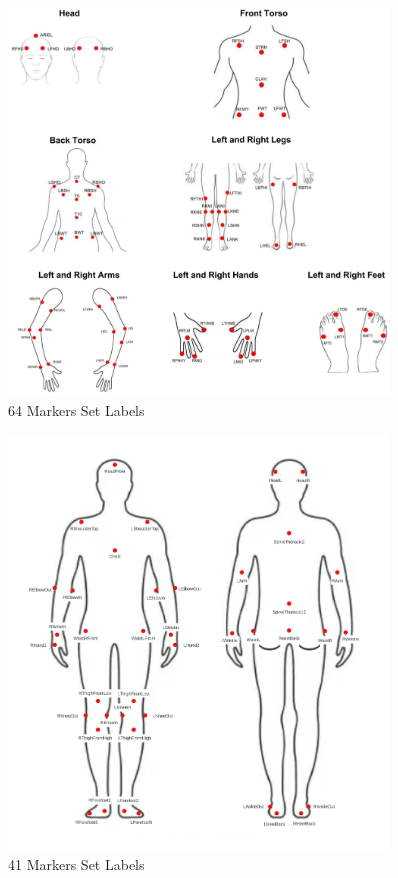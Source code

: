 \begin{figure}[H]
    \centering
    \includegraphics[width=0.9\textwidth]{graphics/full_marker_set.png}
    \caption{64 Markers Set Labels}
    \label{fig:64markers}
\end{figure}

\begin{figure}[H]
    \centering
    \includegraphics[width=0.9\textwidth]{graphics/41Markers.png}
    \caption{41 Markers Set Labels}
    \label{fig:41markers}
\end{figure}



